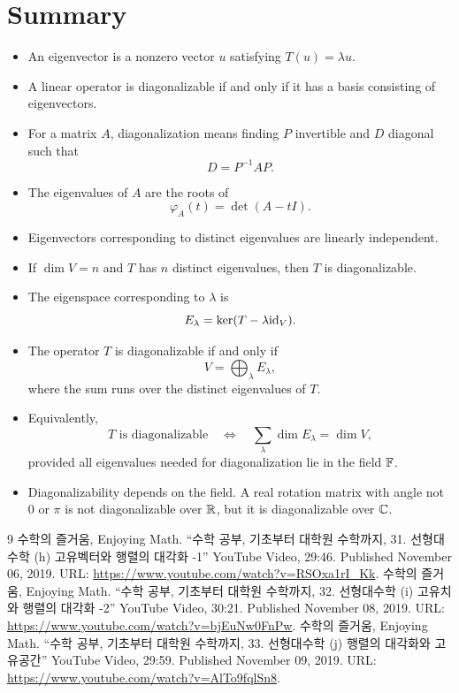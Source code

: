 \documentclass[11pt,openany]{article}
\begin{document}
\section*{Summary}
\begin{itemize}
	\item An eigenvector is a nonzero vector $u$ satisfying $T(u)=\lambda u$.
	\item A linear operator is diagonalizable if and only if it has a basis consisting of eigenvectors.
	\item For a matrix $A$, diagonalization means finding $P$ invertible and $D$ diagonal such that
	\[
	D=P^{-1}AP.
	\]
	\item The eigenvalues of $A$ are the roots of
	\[
	\varphi_A(t)=\det(A-tI).
	\]
	\item Eigenvectors corresponding to distinct eigenvalues are linearly independent.
	\item If $\dim V=n$ and $T$ has $n$ distinct eigenvalues, then $T$ is diagonalizable.
	\item The eigenspace corresponding to $\lambda$ is
	\[
	E_\lambda=\ker(T-\lambda\textnormal{id}_V).
	\]
	\item The operator $T$ is diagonalizable if and only if
	\[
	V=\bigoplus_{\lambda} E_\lambda,
	\]
	where the sum runs over the distinct eigenvalues of $T$.
	\item Equivalently,
	\[
	T\text{ is diagonalizable}
	\quad\Longleftrightarrow\quad
	\sum_{\lambda}\dim E_\lambda=\dim V,
	\]
	provided all eigenvalues needed for diagonalization lie in the field $\mathbb{F}$.
	\item Diagonalizability depends on the field.  A real rotation matrix with angle not $0$ or $\pi$ is not diagonalizable over $\mathbb{R}$, but it is diagonalizable over $\mathbb{C}$.
\end{itemize}


\newpage

\vfill
\begin{thebibliography}{9}
	수학의 즐거움, Enjoying Math. ``수학 공부, 기초부터 대학원 수학까지, 31. 선형대수학 (h) 고유벡터와 행렬의 대각화 -1'' YouTube Video, 29:46. Published 
	November 06, 2019. URL: \url{https://www.youtube.com/watch?v=RSOxa1rI_Kk}.
	수학의 즐거움, Enjoying Math. ``수학 공부, 기초부터 대학원 수학까지, 32. 선형대수학 (i) 고유치와 행렬의 대각화 -2'' YouTube Video, 30:21. Published 
	November 08, 2019. URL: \url{https://www.youtube.com/watch?v=bjEuNw0FnPw}.
	수학의 즐거움, Enjoying Math. ``수학 공부, 기초부터 대학원 수학까지, 33. 선형대수학 (j) 행렬의 대각화와 고유공간'' YouTube Video, 29:59. Published 
	November 09, 2019. URL: \url{https://www.youtube.com/watch?v=AlTo9fqlSn8}.
\end{thebibliography}
\end{document}
